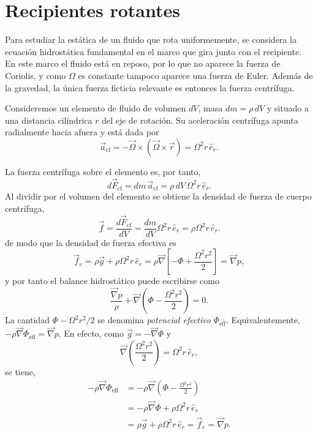 \section{Recipientes rotantes}

Para estudiar la estática de un fluido que rota uniformemente, se considera la ecuación hidrostática fundamental en el marco que gira junto con el recipiente. En este marco el fluido está en reposo, por lo que no aparece la fuerza de Coriolis, y como $\Omega$ es constante tampoco aparece una fuerza de Euler. Además de la gravedad, la única fuerza ficticia relevante es entonces la fuerza centrífuga.

Consideremos un elemento de fluido de volumen $dV$, masa $dm=\rho\,dV$ y situado a una distancia cilíndrica $r$ del eje de rotación. Su aceleración centrífuga apunta radialmente hacia afuera y está dada por
$$
\vec a_{\mathrm{cf}}
=-\vec\Omega\times(\vec\Omega\times\vec r)
=\Omega^2r\,\hat e_r.
$$

\figuraAceleracionCentrifuga

\figuraAceleracionCentrifugaRecipiente

La fuerza centrífuga sobre el elemento es, por tanto,
$$
d\vec F_{\mathrm{cf}}
=dm\,\vec a_{\mathrm{cf}}
=\rho\,dV\,\Omega^2r\,\hat e_r.
$$
Al dividir por el volumen del elemento se obtiene la densidad de fuerza de cuerpo centrífuga,
$$
\vec{f}
=\frac{d\vec F_{\mathrm{cf}}}{dV}
=\frac{dm}{dV}\Omega^2r\,\hat e_r
=\rho\Omega^2r\,\hat e_r.
$$
de modo que la densidad de fuerza efectiva es
$$ \vec{f}_e = \rho\vec{g} + \rho\Omega^2 r\,\hat{e}_r = \rho\vec{\nabla}\left[-\Phi + \frac{\Omega^2 r^2}{2}\right] = \vec{\nabla}p, $$
y por tanto el balance hidrostático puede escribirse como
$$ \frac{\vec{\nabla}p}{\rho} + \vec{\nabla}\left(\Phi - \frac{\Omega^2 r^2}{2}\right) = 0. $$
La cantidad $\Phi - \Omega^2 r^2/2$ se denomina \emph{potencial efectivo} $\Phi_{\mathrm{eff}}$. Equivalentemente, $-\rho\vec{\nabla}\Phi_{\mathrm{eff}} = \vec{\nabla}p$.
En efecto, como $\vec g=-\vec\nabla\Phi$ y
$$
\vec\nabla\left(\frac{\Omega^2r^2}{2}\right)
=\Omega^2r\,\hat e_r,
$$
se tiene,
$$
\begin{aligned}
-\rho\vec\nabla\Phi_{\mathrm{eff}}
&=-\rho\vec\nabla\left(\Phi-\frac{\Omega^2r^2}{2}\right)\\
&=-\rho\vec\nabla\Phi+\rho\Omega^2r\,\hat e_r\\
&=\rho\vec g+\rho\Omega^2r\,\hat e_r
=\vec f_e
=\vec\nabla p.
\end{aligned}
$$

\figuraRecipienteRotante

